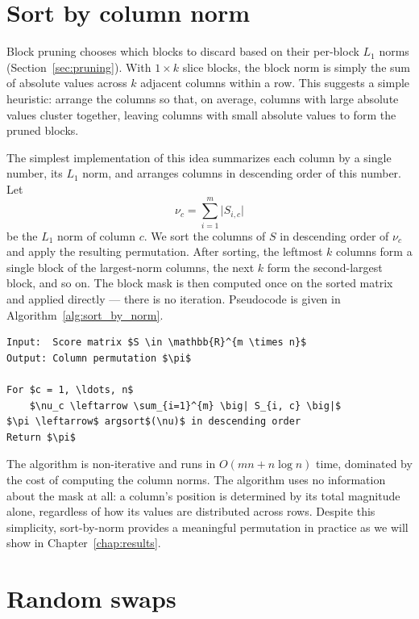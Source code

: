 \section{Sort by column norm}
\label{sec:sort_by_norm}

Block pruning chooses which blocks to discard based on their per-block $L_1$ norms (Section~\ref{sec:pruning}). With $1 \times k$ slice blocks, the block norm is simply the sum of absolute values across $k$ adjacent columns within a row. This suggests a simple heuristic: arrange the columns so that, on average, columns with large absolute values cluster together, leaving columns with small absolute values to form the pruned blocks.

The simplest implementation of this idea summarizes each column by a single number, its $L_1$ norm, and arranges columns in descending order of this number. Let
$$ \nu_c = \sum_{i=1}^{m} \big| S_{i, c} \big| $$
be the $L_1$ norm of column $c$. We sort the columns of $S$ in descending order of $\nu_c$ and apply the resulting permutation. After sorting, the leftmost $k$ columns form a single block of the largest-norm columns, the next $k$ form the second-largest block, and so on. The block mask is then computed once on the sorted matrix and applied directly --- there is no iteration. Pseudocode is given in Algorithm~\ref{alg:sort_by_norm}.

\begin{lstlisting}[style=pseudocode,
                   caption={Sort by column norm},
                   label={alg:sort_by_norm}]
Input:  Score matrix $S \in \mathbb{R}^{m \times n}$
Output: Column permutation $\pi$

For $c = 1, \ldots, n$
    $\nu_c \leftarrow \sum_{i=1}^{m} \big| S_{i, c} \big|$
$\pi \leftarrow$ argsort$(\nu)$ in descending order
Return $\pi$
\end{lstlisting}

The algorithm is non-iterative and runs in $O(mn + n \log n)$ time, dominated by the cost of computing the column norms. The algorithm uses no information about the mask at all: a column's position is determined by its total magnitude alone, regardless of how its values are distributed across rows. Despite this simplicity, sort-by-norm provides a meaningful permutation in practice as we will show in Chapter~\ref{chap:results}.


\section{Random swaps}
\label{sec:random_swaps}

